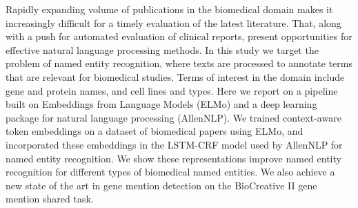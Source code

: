 Rapidly expanding volume of publications in the biomedical domain makes it increasingly difficult for a timely evaluation of the latest literature. That, along with a push for automated evaluation of clinical reports, present opportunities for effective natural language processing methods. In this study we target the problem of named entity recognition, where texts are processed to annotate terms that are relevant for biomedical studies. Terms of interest in the domain include gene and protein names, and cell lines and types. Here we report on a pipeline built on Embeddings from Language Models (ELMo) and a deep learning package for natural language processing (AllenNLP). We trained context-aware token embeddings on a dataset of biomedical papers using ELMo, and incorporated these embeddings in the LSTM-CRF model used by AllenNLP for named entity recognition. We show these representations improve named entity recognition for different types of biomedical named entities. We also achieve a new state of the art in gene mention detection on the BioCreative II gene mention shared task.
